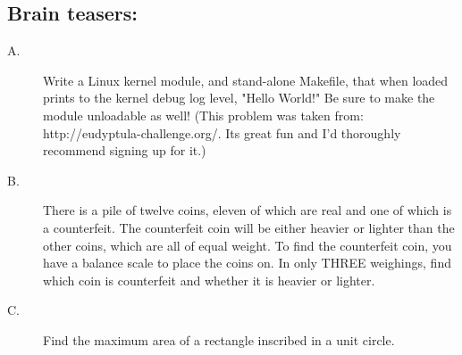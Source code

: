 \documentclass{article}
\begin{document}
\subsection*{Brain teasers:}
\begin{description}
\item[A.] Write a Linux kernel module, and stand-alone Makefile, that when loaded prints to the kernel debug log level, "Hello World!"  Be sure to make the module unloadable as well! (This problem was taken from: http://eudyptula-challenge.org/. Its great fun and I'd thoroughly recommend signing up for it.)

\item[B.] There is a pile of twelve coins, eleven of which are real and one of which is a counterfeit. The counterfeit coin will be either heavier or lighter than the other coins, which are all of equal weight. To find the counterfeit coin, you have a balance scale to place the coins on. In only THREE weighings, find which coin is counterfeit and whether it is heavier or lighter.  %

\item[C.] Find the maximum area of a rectangle inscribed in a unit circle. %
\end{description}
\end{document}
